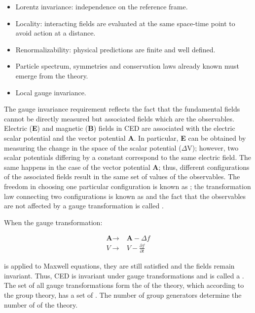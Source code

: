 \begin{itemize}
\item Lorentz invariance: independence on the reference frame.  
\item Locality: interacting fields are evaluated at the same space-time point to avoid action at a distance. 
\item Renormalizability: physical predictions are finite and well defined. 
\item Particle spectrum, symmetries and conservation laws already known must emerge from the theory.
\item Local gauge invariance.
\end{itemize}

The gauge invariance requirement reflects the fact that the fundamental fields cannot be directly measured but associated fields which are the observables. Electric (\textbf{E}) and magnetic (\textbf{B}) fields in CED are associated with the electric scalar potential  and the vector potential \textbf{A}. In particular, \textbf{E} can be obtained by measuring the change in the space of the scalar potential (\textbf{$\Delta$}V); however, two scalar potentials differing by a constant  correspond to the same electric field. The same happens in the case of the vector potential \textbf{A}; thus, different configurations of the associated fields result in the same set of values of the observables. The freedom in choosing one particular configuration is known as ; the transformation law connecting two configurations is known as  and the fact that the observables are not affected by a gauge transformation is called .

When the gauge transformation:  

\begin{align}\label{cov_der}
\textbf{A} \to &\textbf{A} -\Delta f\nonumber\\
V \to & V - \frac{\partial f}{\partial t}
\end{align}

\noindent is applied to Maxwell equations, they are still satisfied and the fields remain invariant. Thus, CED is invariant under gauge transformations and is called a . The set of all gauge transformations form the  of the theory, which according to the group theory, has a set of . The number of group generators determine the number of  of the theory.

